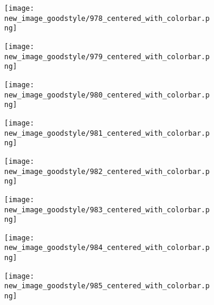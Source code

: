 \documentclass[a4paper,12pt]{article}
\begin{document}
\begin{figure}[H]
  \begin{subfigure}{0.11\textwidth}
    \texttt{[image: new\_image\_goodstyle/978\_centered\_with\_colorbar.png]}
  \end{subfigure}
  \hfill
  \begin{subfigure}{0.11\textwidth}
    \texttt{[image: new\_image\_goodstyle/979\_centered\_with\_colorbar.png]}
  \end{subfigure}
  \hfill
  \begin{subfigure}{0.11\textwidth}
    \texttt{[image: new\_image\_goodstyle/980\_centered\_with\_colorbar.png]}
  \end{subfigure}
  \hfill
  \begin{subfigure}{0.11\textwidth}
    \texttt{[image: new\_image\_goodstyle/981\_centered\_with\_colorbar.png]}
  \end{subfigure}
  \hfill
  \begin{subfigure}{0.11\textwidth}
    \texttt{[image: new\_image\_goodstyle/982\_centered\_with\_colorbar.png]}
  \end{subfigure}
  \hfill
  \begin{subfigure}{0.11\textwidth}
    \texttt{[image: new\_image\_goodstyle/983\_centered\_with\_colorbar.png]}
  \end{subfigure}
  \hfill
  \begin{subfigure}{0.11\textwidth}
    \texttt{[image: new\_image\_goodstyle/984\_centered\_with\_colorbar.png]}
  \end{subfigure}
  \hfill
  \begin{subfigure}{0.11\textwidth}
    \texttt{[image: new\_image\_goodstyle/985\_centered\_with\_colorbar.png]}
  \end{subfigure}
  \hfill
\end{figure}
\end{document}
